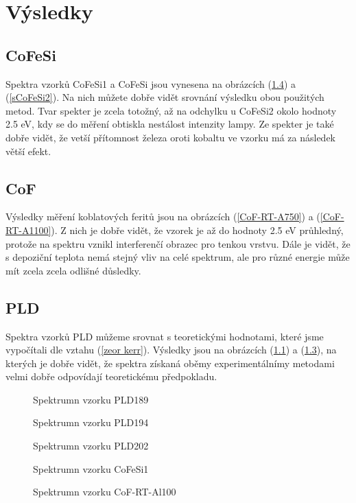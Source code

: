 \chapter{Výsledky}
\section{CoFeSi}
Spektra vzorků CoFeSi1 a CoFeSi jsou vynesena na obrázcích (\ref{sCoFeSi1}) a (\ref{sCoFeSi2}). Na nich můžete dobře vidět srovnání výsledku obou použitých metod. Tvar spekter je zcela totožný, až na odchylku u CoFeSi2 okolo hodnoty 2.5 eV, kdy se do měření obtiskla nestálost intenzity lampy. Ze spekter je také dobře vidět, že vetší přítomnost železa oroti kobaltu ve vzorku má za následek větší efekt.

\section{CoF}
Výsledky měření koblatových feritů jsou na obrázcích (\ref{CoF-RT-A750}) a (\ref{CoF-RT-A1100}). Z nich je dobře vidět, že vzorek je až do hodnoty 2.5 eV průhledný, protože na spektru vznikl interferenčí obrazec pro tenkou vrstvu. Dále je vidět, že s depoziční teplota nemá stejný vliv na celé spektrum, ale pro různé energie může mít zcela zcela odlišné důsledky.

\section{PLD}
Spektra vzorků PLD můžeme srovnat s teoretickými hodnotami, které jsme vypočítali dle vztahu (\ref{zeor kerr}). Výsledky jsou na obrázcích (\ref{sPLD189}) a (\ref{sPLD202}), na kterých je dobře vidět, že spektra získaná oběmy experimentálnímy metodami velmi dobře odpovídají teoretickému předpokladu.

\begin{figure}

\caption{Spektrumn vzorku PLD189}
\label{sPLD189}
\end{figure}

\begin{figure}

\caption{Spektrumn vzorku PLD194}
\label{sPLD194}
\end{figure}

\begin{figure}

\caption{Spektrumn vzorku PLD202}
\label{sPLD202}
\end{figure}

\begin{figure}

\caption{Spektrumn vzorku CoFeSi1}
\label{sCoFeSi1}
\end{figure}

\begin{figure}

\caption{Spektrumn vzorku CoF-RT-Al100}
\label{sCoF-RT-Al100}
\end{figure}

